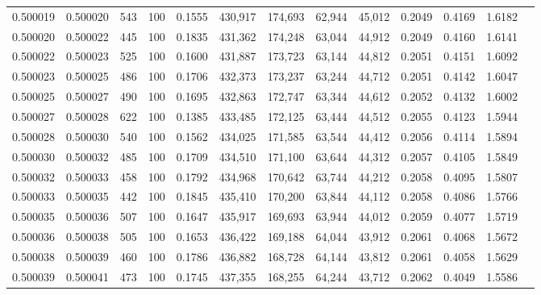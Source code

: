 \begin{tabular}{rrrrrrrrrrrrr}
0.500019 & 0.500020 &   543 & 100 &                                     0.1555 & 430,917 & 174,693 &  62,944 &  45,012 & 0.2049 & 0.4169 & 1.6182 \\
0.500020 & 0.500022 &   445 & 100 &                                     0.1835 & 431,362 & 174,248 &  63,044 &  44,912 & 0.2049 & 0.4160 & 1.6141 \\
0.500022 & 0.500023 &   525 & 100 &                                     0.1600 & 431,887 & 173,723 &  63,144 &  44,812 & 0.2051 & 0.4151 & 1.6092 \\
0.500023 & 0.500025 &   486 & 100 &                                     0.1706 & 432,373 & 173,237 &  63,244 &  44,712 & 0.2051 & 0.4142 & 1.6047 \\
0.500025 & 0.500027 &   490 & 100 &                                     0.1695 & 432,863 & 172,747 &  63,344 &  44,612 & 0.2052 & 0.4132 & 1.6002 \\
0.500027 & 0.500028 &   622 & 100 &                                     0.1385 & 433,485 & 172,125 &  63,444 &  44,512 & 0.2055 & 0.4123 & 1.5944 \\
0.500028 & 0.500030 &   540 & 100 &                                     0.1562 & 434,025 & 171,585 &  63,544 &  44,412 & 0.2056 & 0.4114 & 1.5894 \\
0.500030 & 0.500032 &   485 & 100 &                                     0.1709 & 434,510 & 171,100 &  63,644 &  44,312 & 0.2057 & 0.4105 & 1.5849 \\
0.500032 & 0.500033 &   458 & 100 &                                     0.1792 & 434,968 & 170,642 &  63,744 &  44,212 & 0.2058 & 0.4095 & 1.5807 \\
0.500033 & 0.500035 &   442 & 100 &                                     0.1845 & 435,410 & 170,200 &  63,844 &  44,112 & 0.2058 & 0.4086 & 1.5766 \\
0.500035 & 0.500036 &   507 & 100 &                                     0.1647 & 435,917 & 169,693 &  63,944 &  44,012 & 0.2059 & 0.4077 & 1.5719 \\
0.500036 & 0.500038 &   505 & 100 &                                     0.1653 & 436,422 & 169,188 &  64,044 &  43,912 & 0.2061 & 0.4068 & 1.5672 \\
0.500038 & 0.500039 &   460 & 100 &                                     0.1786 & 436,882 & 168,728 &  64,144 &  43,812 & 0.2061 & 0.4058 & 1.5629 \\
0.500039 & 0.500041 &   473 & 100 &                                     0.1745 & 437,355 & 168,255 &  64,244 &  43,712 & 0.2062 & 0.4049 & 1.5586 \\

\end{tabular}
